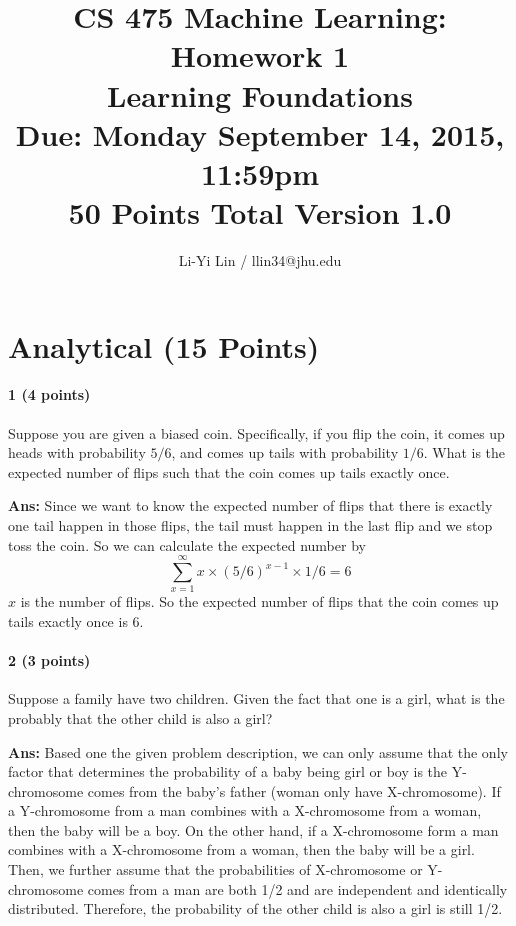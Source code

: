 \documentclass[11pt]{article}
\title{CS 475 Machine Learning: Homework 1\\Learning Foundations\\
\Large{Due: Monday September 14, 2015, 11:59pm}\\
50 Points Total \hspace{1cm} Version 1.0}
\author{Li-Yi Lin / llin34@jhu.edu}
\date{}
\begin{document}
\large
\maketitle
\thispagestyle{headings}

\vspace{-.5in}




\section{Analytical (15 Points)}

\paragraph{1 (4 points)} Suppose you are given a biased coin. Specifically, if you flip the coin, it comes up heads with probability $5/6$, and comes up tails with probability $1/6$.  What is the expected number of flips such that the coin comes up tails exactly once.

\noindent
\textbf{Ans:} 
Since we want to know the expected number of flips that there is exactly one tail happen in those flips, the tail must happen in the last flip and we stop toss the coin. So we can calculate the expected number by 
$$\sum_{x = 1}^{\infty} x \times (5/6)^{x-1} \times 1/6 = 6$$
$x$ is the number of flips.
So the expected number of flips that the coin comes up tails exactly once is 6.


\paragraph{2 (3 points)} Suppose a family have two children. Given the fact that one is a girl, what is the probably that the other child is also a girl?

\noindent
\textbf{Ans:}
Based one the given problem description, we can only assume that the only factor that determines the probability of a baby being girl or boy is the Y-chromosome comes from the baby's father (woman only have X-chromosome). If a Y-chromosome from a man combines with a X-chromosome from a woman, then the baby will be a boy. On the other hand, if a X-chromosome form a man combines with a X-chromosome from a woman, then the baby will be a girl. Then, we further assume that the probabilities of X-chromosome or Y-chromosome comes from a man are both 1/2 and are independent and identically distributed. Therefore, the probability of the other child is also a girl is still 1/2.
\end{document}
